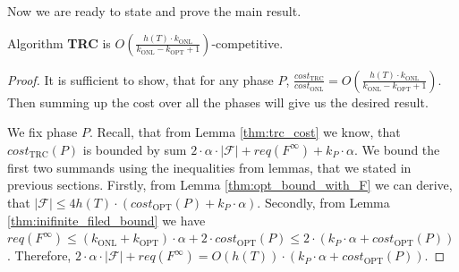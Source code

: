 Now we are ready to state and prove the main result.  \begin{theorem} Algorithm
\textbf{TRC} is $O(\frac{h(T) \cdot k_{\mathrm{ONL}}}{k_{\mathrm{ONL}} -
k_{\mathrm{OPT}} + 1})$-competitive.  \label{thm:main_theorem} \end{theorem}
\begin{proof} It is sufficient to show, that for any phase $P$,
$\frac{cost_{\mathrm{TRC}}}{cost_{\mathrm{ONL}}} = O(\frac{h(T) \cdot
k_{\mathrm{ONL}}}{k_{\mathrm{ONL}} - k_{\mathrm{OPT}} + 1})$. Then summing up
the cost over all the phases will give us the desired result.

We fix phase $P$. Recall, that from Lemma \ref{thm:trc_cost} we know, that
$cost_{\mathrm{TRC}}(P)$ is bounded by sum $2 \cdot \alpha \cdot |\mathcal{F}| +
req(F^{\infty}) + k_P \cdot \alpha$. We bound the first two summands using the
inequalities from lemmas, that we stated in previous sections. Firstly, from
Lemma \ref{thm:opt_bound_with_F} we can derive, that $|\mathcal{F}| \leq 4h(T)
\cdot (cost_{\mathrm{OPT}}(P) + k_P \cdot \alpha)$. Secondly, from Lemma
\ref{thm:inifinite_filed_bound} we have $req(F^{\infty}) \leq (k_{\mathrm{ONL}}
+ k_{\mathrm{OPT}}) \cdot \alpha + 2 \cdot cost_{\mathrm{OPT}}(P) \leq 2 \cdot
(k_P \cdot \alpha + cost_{\mathrm{OPT}}(P))$. Therefore, $2 \cdot \alpha \cdot
|\mathcal{F}| + req(F^{\infty}) = O(h(T)) \cdot (k_P \cdot \alpha +
cost_{\mathrm{OPT}}(P))$.  \end{proof}

